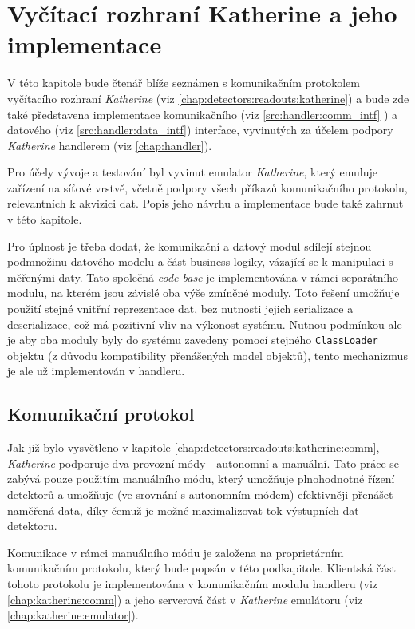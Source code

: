 

\chapter{Vyčítací rozhraní Katherine a jeho implementace}\label{chap:katherine}
V této kapitole bude čtenář blíže seznámen s komunikačním protokolem vyčítacího rozhraní \textit{Katherine} (viz \ref{chap:detectors:readouts:katherine}) a bude zde také představena implementace komunikačního (viz \ref{src:handler:comm_intf} ) a datového (viz \ref{src:handler:data_intf}) interface, vyvinutých za účelem podpory \textit{Katherine} handlerem (viz \ref{chap:handler}). 

Pro účely vývoje a testování byl vyvinut emulator \textit{Katherine}, který emuluje zařízení na síťové vrstvě, včetně podpory všech příkazů komunikačního protokolu, relevantních k akvizici dat. Popis jeho návrhu a implementace bude také zahrnut v této kapitole.

Pro úplnost je třeba dodat, že komunikační a datový modul sdílejí stejnou podmnožinu datového modelu a část business-logiky, vázající se k manipulaci s měřenými daty. Tato společná \textit{code-base} je implementována v rámci separátního modulu, na kterém jsou závislé oba výše zmíněné moduly. Toto řešení umožňuje použití stejné vnitřní reprezentace dat, bez nutnosti jejich serializace a deserializace, což má pozitivní vliv na výkonost systému. Nutnou podmínkou ale je aby oba moduly byly do systému zavedeny pomocí stejného \texttt{ClassLoader} objektu (z důvodu kompatibility přenášených model objektů), tento mechanizmus je ale už implementován v handleru.

\section{Komunikační protokol}\label{chap:katherine:protocol}
Jak již bylo vysvětleno v kapitole \ref{chap:detectors:readouts:katherine:comm}, \textit{Katherine} podporuje dva provozní módy - autonomní a manuální. Tato práce se zabývá pouze použitím manuálního módu, který umožňuje plnohodnotné řízení detektorů a umožňuje (ve srovnání s autonomním módem) efektivněji přenášet naměřená data, díky čemuž je možné maximalizovat tok výstupních dat detektoru.

Komunikace v rámci manuálního módu je založena na proprietárním komunikačním protokolu, který bude popsán v této podkapitole. Klientská část tohoto protokolu je implementována v komunikačním modulu handleru (viz \ref{chap:katherine:comm}) a jeho serverová část v \textit{Katherine} emulátoru (viz \ref{chap:katherine:emulator}).

